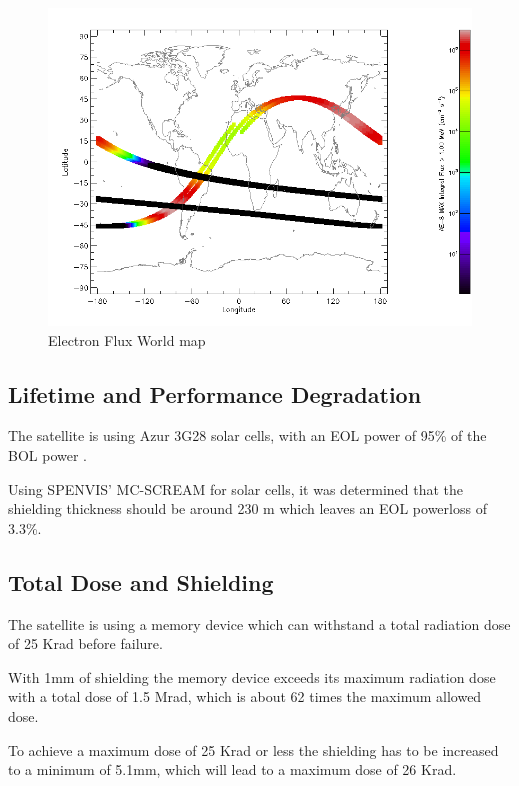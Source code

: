 \begin{figure}[h]
	\centering
	\includegraphics[width=\linewidth-5em]{spenvis/electron_wmap}
		\caption{Electron Flux World map}
		 \label{fig:e_wmap}
\end{figure}

\subsection{Lifetime and Performance Degradation}

The satellite is using Azur 3G28 solar cells, with an EOL power of 95\% of the BOL power \citep{evans:labInstructions}.

Using SPENVIS' MC-SCREAM for solar cells, it was determined that the shielding thickness should be around 230 \textmu m which leaves an EOL powerloss of 3.3\%.

\subsection{Total Dose and Shielding}

The satellite is using a memory device which can withstand a total radiation dose of 25 Krad before failure.

With 1mm of shielding the memory device exceeds its maximum radiation dose with a total dose of 1.5 Mrad, which is about 62 times the maximum allowed dose.

To achieve a maximum dose of 25 Krad or less the shielding has to be increased to a minimum of 5.1mm, which will lead to a maximum dose of 26 Krad.


